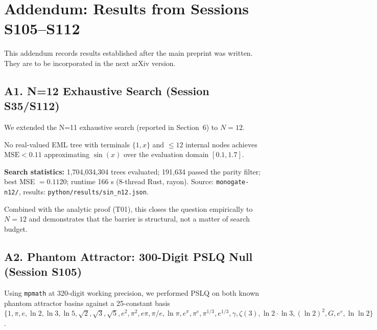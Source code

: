 
\section*{Addendum: Results from Sessions S105--S112}

This addendum records results established after the main preprint was
written. They are to be incorporated in the next arXiv version.

\subsection*{A1. N=12 Exhaustive Search (Session S35/S112)}

We extended the N=11 exhaustive search (reported in Section~6) to $N=12$.

\begin{theorem}[N=12 Barrier Confirmation]
No real-valued EML tree with terminals $\{1, x\}$ and $\leq 12$ internal
nodes achieves $\mathrm{MSE} < 0.11$ approximating $\sin(x)$ over
the evaluation domain $[0.1, 1.7]$.
\end{theorem}

\textbf{Search statistics:} 1,704,034,304 trees evaluated; 191,634 passed
the parity filter; best MSE $= 0.1120$; runtime 166 s (8-thread Rust, rayon).
Source: \texttt{monogate-n12/}, results: \texttt{python/results/sin\_n12.json}.

Combined with the analytic proof (T01), this closes the question empirically
to $N=12$ and demonstrates that the barrier is structural, not a matter
of search budget.

\subsection*{A2. Phantom Attractor: 300-Digit PSLQ Null (Session S105)}

Using \texttt{mpmath} at 320-digit working precision, we performed PSLQ
on both known phantom attractor basins against a 25-constant basis
$\{1, \pi, e, \ln 2, \ln 3, \ln 5, \sqrt{2}, \sqrt{3}, \sqrt{5}, e^2,
\pi^2, e\pi, \pi/e, \ln\pi, e^\pi, \pi^e, \pi^{1/3}, e^{1/3},
\gamma, \zeta(3), \ln 2 \cdot \ln 3, (\ln 2)^2, G, e^e, \ln\ln 2\}$.

